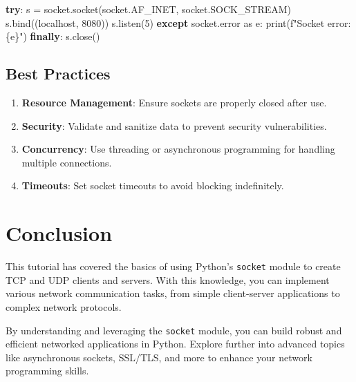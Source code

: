 \documentclass[
  letterpaper,
  DIV=11,
  numbers=noendperiod]{scrreprt}
\newenvironment{Shaded}{\begin{snugshade}}{\end{snugshade}}
\newcommand{\BuiltInTok}[1]{\textcolor[rgb]{0.00,0.23,0.31}{#1}}
\newcommand{\ControlFlowTok}[1]{\textcolor[rgb]{0.00,0.23,0.31}{\textbf{#1}}}
\newcommand{\DecValTok}[1]{\textcolor[rgb]{0.68,0.00,0.00}{#1}}
\newcommand{\ImportTok}[1]{\textcolor[rgb]{0.00,0.46,0.62}{#1}}
\newcommand{\NormalTok}[1]{\textcolor[rgb]{0.00,0.23,0.31}{#1}}
\newcommand{\OperatorTok}[1]{\textcolor[rgb]{0.37,0.37,0.37}{#1}}
\newcommand{\SpecialCharTok}[1]{\textcolor[rgb]{0.37,0.37,0.37}{#1}}
\newcommand{\SpecialStringTok}[1]{\textcolor[rgb]{0.13,0.47,0.30}{#1}}
\newcommand{\StringTok}[1]{\textcolor[rgb]{0.13,0.47,0.30}{#1}}
\providecommand{\tightlist}{%
  \setlength{\itemsep}{0pt}\setlength{\parskip}{0pt}}\usepackage{longtable,booktabs,array}
\begin{document}
\begin{Shaded}
\begin{Highlighting}[]
\ControlFlowTok{try}\NormalTok{:}
\NormalTok{    s }\OperatorTok{=}\NormalTok{ socket.socket(socket.AF\_INET, socket.SOCK\_STREAM)}
\NormalTok{    s.bind((}\StringTok{\textquotesingle{}localhost\textquotesingle{}}\NormalTok{, }\DecValTok{8080}\NormalTok{))}
\NormalTok{    s.listen(}\DecValTok{5}\NormalTok{)}
\ControlFlowTok{except}\NormalTok{ socket.error }\ImportTok{as}\NormalTok{ e:}
    \BuiltInTok{print}\NormalTok{(}\SpecialStringTok{f"Socket error: }\SpecialCharTok{\{}\NormalTok{e}\SpecialCharTok{\}}\SpecialStringTok{"}\NormalTok{)}
\ControlFlowTok{finally}\NormalTok{:}
\NormalTok{    s.close()}
\end{Highlighting}
\end{Shaded}

\subsection{Best Practices}\label{best-practices-3}

\begin{enumerate}
\def\labelenumi{\arabic{enumi}.}
\tightlist
\item
  \textbf{Resource Management}: Ensure sockets are properly closed after
  use.
\item
  \textbf{Security}: Validate and sanitize data to prevent security
  vulnerabilities.
\item
  \textbf{Concurrency}: Use threading or asynchronous programming for
  handling multiple connections.
\item
  \textbf{Timeouts}: Set socket timeouts to avoid blocking indefinitely.
\end{enumerate}

\section{Conclusion}\label{conclusion-34}

This tutorial has covered the basics of using Python's \texttt{socket}
module to create TCP and UDP clients and servers. With this knowledge,
you can implement various network communication tasks, from simple
client-server applications to complex network protocols.

By understanding and leveraging the \texttt{socket} module, you can
build robust and efficient networked applications in Python. Explore
further into advanced topics like asynchronous sockets, SSL/TLS, and
more to enhance your network programming skills.
\end{document}
